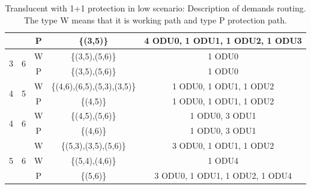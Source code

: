 \begin{table}[h!]
\begin{tabular}{||c|c|c|c|c||}
  & &P& \{(3,5)\} & 4 ODU0, 1 ODU1, 1 ODU2, 1 ODU3 \\ \hline
 \multirow{2}{*}{3} & \multirow{2}{*}{6}&W& \{(3,5),(5,6)\} & 1 ODU0 \\
  & &P& \{(3,5),(5,6)\} & 1 ODU0 \\ \hline
 \multirow{2}{*}{4} & \multirow{2}{*}{5}&W& \{(4,6),(6,5),(5,3),(3,5)\} & 1 ODU0, 1 ODU1, 1 ODU2 \\
  & &P& \{(4,5)\} & 1 ODU0, 1 ODU1, 1 ODU2 \\ \hline
 \multirow{2}{*}{4} & \multirow{2}{*}{6}&W& \{(4,5),(5,6)\} & 1 ODU0, 3 ODU1\\
  & &P& \{(4,6)\} & 1 ODU0, 3 ODU1\\ \hline
 \multirow{3}{*}{5} & \multirow{3}{*}{6}&W&\{(5,3),(3,5),(5,6)\}& 3 ODU0, 1 ODU1, 1 ODU2 \\
  & &W& \{(5,4),(4,6)\} & 1 ODU4 \\
  & &P& \{(5,6)\}& 3 ODU0, 1 ODU1, 1 ODU2, 1 ODU4 \\ \hline
\end{tabular}
\caption{Translucent with 1+1 protection in low scenario: Description of demands routing. The type W means that it is working path and type P protection path.}
\label{path_transluc_protec_ref_low}
\end{table}


